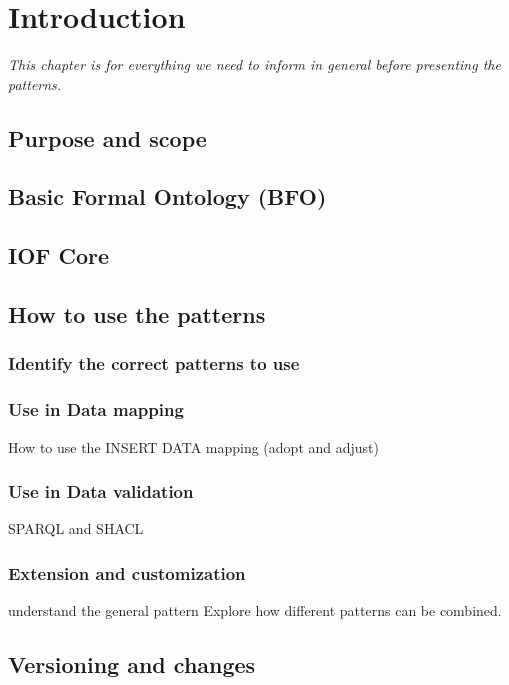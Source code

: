 \chapter{Introduction}
\label{chapter:introduction}
\textit{
This chapter is for everything we need to inform in general before presenting the patterns.
}


\section*{Purpose and scope}

\section*{Basic Formal Ontology (BFO)}

\section*{IOF Core}


\section*{How to use the patterns}

\subsection*{Identify the correct patterns to use}


\subsection*{Use in Data mapping}
How to use the INSERT DATA mapping (adopt and adjust) 

\subsection*{Use in Data validation}
SPARQL and SHACL

\subsection*{Extension and customization}
understand the general pattern
Explore how different patterns can be combined.

\section*{Versioning and changes}
